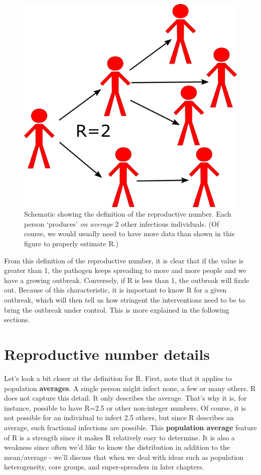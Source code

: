 \documentclass[]{book}
\theoremstyle{definition}
\theoremstyle{definition}
\theoremstyle{definition}
\theoremstyle{remark}
\begin{document}
\begin{figure}
\centering
\includegraphics{./images/R0scheme.png}
\caption{Schematic showing the definition of the reproductive number.
Each person `produces' \emph{on average} 2 other infectious individuals.
(Of course, we would usually need to have more data than shown in this
figure to properly estimate R.)}
\end{figure}

From this definition of the reproductive number, it is clear that if the
value is greater than 1, the pathogen keeps spreading to more and more
people and we have a growing outbreak. Conversely, if R is less than 1,
the outbreak will fizzle out. Because of this characteristic, it is
important to know R for a given outbreak, which will then tell us how
stringent the interventions need to be to bring the outbreak under
control. This is more explained in the following sections.

\section{Reproductive number details}\label{reproductive-number-details}

Let's look a bit closer at the definition for R. First, note that it
applies to population \textbf{averages}. A single person might infect
none, a few or many others. R does not capture this detail. It only
describes the average. That's why it is, for instance, possible to have
R=2.5 or other non-integer numbers. Of course, it is not possible for an
individual to infect 2.5 others, but since R describes an average, such
fractional infections are possible. This \textbf{population average}
feature of R is a strength since it makes R relatively easy to
determine. It is also a weakness since often we'd like to know the
distribution in addition to the mean/average - we'll discuss that when
we deal with ideas such as population heterogeneity, core groups, and
super-spreaders in later chapters.
\end{document}
